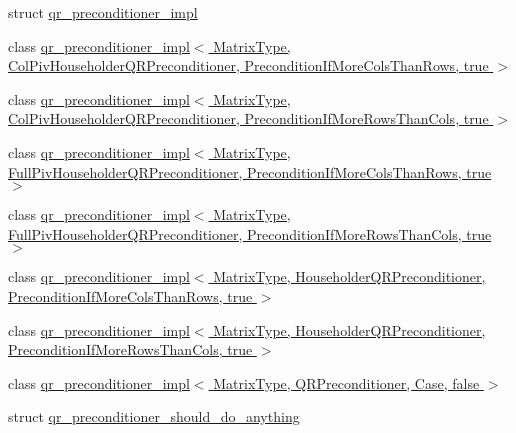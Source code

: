 \begin{DoxyCompactItemize}
\item 
struct \hyperlink{struct_eigen_1_1internal_1_1qr__preconditioner__impl}{qr\+\_\+preconditioner\+\_\+impl}
\item 
class \hyperlink{class_eigen_1_1internal_1_1qr__preconditioner__impl_3_01_matrix_type_00_01_col_piv_householder_q9febbd0c27c13f65b619ca11d9f35cb8}{qr\+\_\+preconditioner\+\_\+impl$<$ Matrix\+Type, Col\+Piv\+Householder\+Q\+R\+Preconditioner, Precondition\+If\+More\+Cols\+Than\+Rows, true $>$}
\item 
class \hyperlink{class_eigen_1_1internal_1_1qr__preconditioner__impl_3_01_matrix_type_00_01_col_piv_householder_q4429b16903ed71549d5aafc43959c2c2}{qr\+\_\+preconditioner\+\_\+impl$<$ Matrix\+Type, Col\+Piv\+Householder\+Q\+R\+Preconditioner, Precondition\+If\+More\+Rows\+Than\+Cols, true $>$}
\item 
class \hyperlink{class_eigen_1_1internal_1_1qr__preconditioner__impl_3_01_matrix_type_00_01_full_piv_householder_0bfd000ff4c8127883e77da4144b4435}{qr\+\_\+preconditioner\+\_\+impl$<$ Matrix\+Type, Full\+Piv\+Householder\+Q\+R\+Preconditioner, Precondition\+If\+More\+Cols\+Than\+Rows, true $>$}
\item 
class \hyperlink{class_eigen_1_1internal_1_1qr__preconditioner__impl_3_01_matrix_type_00_01_full_piv_householder_b68efcf0da0383d73ce7fb20aafa2293}{qr\+\_\+preconditioner\+\_\+impl$<$ Matrix\+Type, Full\+Piv\+Householder\+Q\+R\+Preconditioner, Precondition\+If\+More\+Rows\+Than\+Cols, true $>$}
\item 
class \hyperlink{class_eigen_1_1internal_1_1qr__preconditioner__impl_3_01_matrix_type_00_01_householder_q_r_preco31667955395337fca0dd5f85cded2a6b}{qr\+\_\+preconditioner\+\_\+impl$<$ Matrix\+Type, Householder\+Q\+R\+Preconditioner, Precondition\+If\+More\+Cols\+Than\+Rows, true $>$}
\item 
class \hyperlink{class_eigen_1_1internal_1_1qr__preconditioner__impl_3_01_matrix_type_00_01_householder_q_r_preco3db9481bdea35fcb59961342158459cb}{qr\+\_\+preconditioner\+\_\+impl$<$ Matrix\+Type, Householder\+Q\+R\+Preconditioner, Precondition\+If\+More\+Rows\+Than\+Cols, true $>$}
\item 
class \hyperlink{class_eigen_1_1internal_1_1qr__preconditioner__impl_3_01_matrix_type_00_01_q_r_preconditioner_00_01_case_00_01false_01_4}{qr\+\_\+preconditioner\+\_\+impl$<$ Matrix\+Type, Q\+R\+Preconditioner, Case, false $>$}
\item 
struct \hyperlink{struct_eigen_1_1internal_1_1qr__preconditioner__should__do__anything}{qr\+\_\+preconditioner\+\_\+should\+\_\+do\+\_\+anything}

\end{DoxyCompactItemize}
